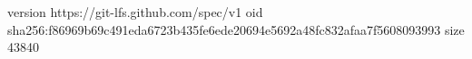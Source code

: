 version https://git-lfs.github.com/spec/v1
oid sha256:f86969b69c491eda6723b435fe6ede20694e5692a48fc832afaa7f5608093993
size 43840
